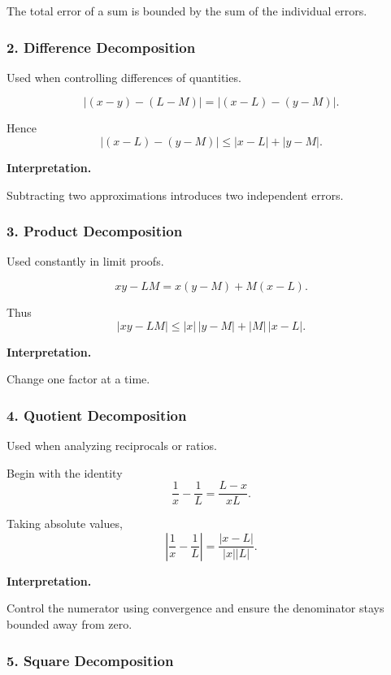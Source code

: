 The total error of a sum is bounded by the sum of the individual errors.

\bigskip

\subsubsection*{2. Difference Decomposition}

Used when controlling differences of quantities.

\[
|(x-y) - (L-M)|
=
|(x-L) - (y-M)|.
\]

Hence
\[
|(x-L)-(y-M)|
\le
|x-L| + |y-M|.
\]

\textbf{Interpretation.}

Subtracting two approximations introduces two independent errors.

\bigskip

\subsubsection*{3. Product Decomposition}

Used constantly in limit proofs.

\[
xy - LM
=
x(y-M) + M(x-L).
\]

Thus
\[
|xy - LM|
\le
|x|\,|y-M| + |M|\,|x-L|.
\]

\textbf{Interpretation.}

Change one factor at a time.

\bigskip

\subsubsection*{4. Quotient Decomposition}

Used when analyzing reciprocals or ratios.

Begin with the identity
\[
\frac{1}{x} - \frac{1}{L}
=
\frac{L-x}{xL}.
\]

Taking absolute values,
\[
\left|\frac{1}{x}-\frac{1}{L}\right|
=
\frac{|x-L|}{|x||L|}.
\]

\textbf{Interpretation.}

Control the numerator using convergence and ensure the denominator stays
bounded away from zero.

\bigskip

\subsubsection*{5. Square Decomposition}

